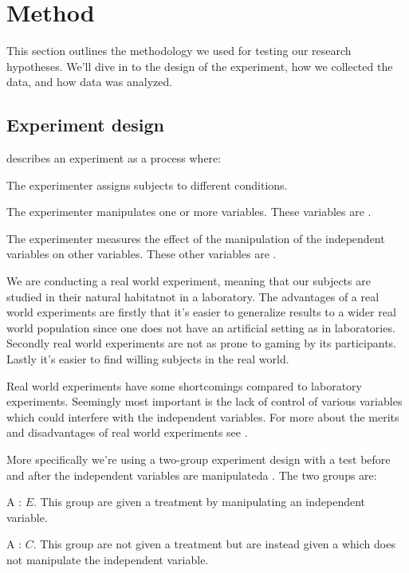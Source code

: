 \section{Method}
\label{section:empirical.methodology}

This section outlines the methodology we used for testing our research
hypotheses. We'll dive in to the design of the experiment, how we collected
the data, and how data was analyzed.

\subsection{Experiment design}
\label{section:empirical.methodology.experiment.design}

\citet[]{robson93} describes an experiment as a process where:


\begin{items}
  \item The experimenter assigns subjects to different conditions.
  \item The experimenter manipulates one or more variables.
    These variables are .
  \item The experimenter measures the effect of the manipulation of
    the independent variables on other variables. These other
    variables are .
\end{items}

We are conducting a real world experiment, meaning that our subjects
are studied in their natural habitat\dash{}not in a laboratory.
The advantages of a real world experiments are firstly that it's easier to
generalize results to a wider real world population since one does not have
an artificial setting as in laboratories. Secondly real world experiments are
not as prone to gaming by its participants. Lastly it's easier to find willing
subjects in the real world.

Real world experiments have some shortcomings compared to laboratory
experiments. Seemingly most important is the lack of control of various
variables which could interfere with the independent variables.
For more about the merits and disadvantages of real world experiments
see \citet[]{robson93}.

More specifically we're using a two-group experiment design with a test before
and after the independent variables are manipulated\dash{}a .
The two groups are:

\begin{items}
  \item A : $E$. This group are given a treatment by
    manipulating an independent variable.
  \item A : $C$. This group are not given a treatment but
    are instead given a  which does not manipulate the
    independent variable.
\end{items}

